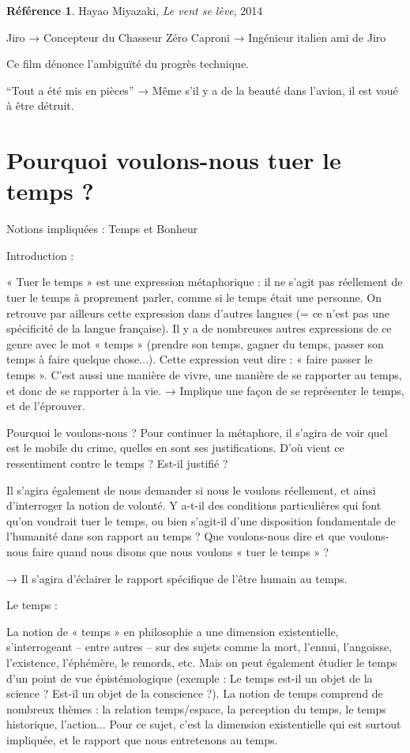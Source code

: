 \documentclass[french]{book}
\theoremstyle{definition}
\newtheorem*{refe}{Référence}
\begin{document}
\begin{refe}
	Hayao Miyazaki, \textit{Le vent se lève}, 2014
\end{refe}

Jiro → Concepteur du Chasseur Zéro
Caproni → Ingénieur italien ami de Jiro

Ce film dénonce l’ambiguïté du progrès technique.

“Tout a été mis en pièces” → Même s’il y a de la beauté dans l’avion, il est voué à être détruit.


\chapter{Pourquoi voulons-nous tuer le temps ?}

Notions impliquées : Temps et Bonheur

Introduction :

« Tuer le temps » est une expression métaphorique : il ne s’agit pas réellement de tuer le temps à proprement parler, comme si le temps était une personne. On retrouve par ailleurs cette expression dans d’autres langues (= ce n’est pas une spécificité de la langue française). Il y a de nombreuses autres expressions de ce genre avec le mot « temps » (prendre son temps, gagner du temps, passer son temps à faire quelque chose...). Cette expression veut dire : « faire passer le temps ». C’est aussi une manière de vivre, une manière de se rapporter au temps, et donc de se rapporter à la vie. → Implique une façon de se représenter le temps, et de l’éprouver.

Pourquoi le voulons-nous ? Pour continuer la métaphore, il s’agira de voir quel est le mobile du crime, quelles en sont ses justifications. D’où vient ce ressentiment contre le temps ? Est-il justifié ?

Il s’agira également de nous demander si nous le voulons réellement, et ainsi d’interroger la notion de volonté. Y a-t-il des conditions particulières qui font qu’on voudrait tuer le temps, ou bien s’agit-il d’une disposition fondamentale de l’humanité dans son rapport au temps ? Que voulons-nous dire et que voulons-nous faire quand nous disons que nous voulons « tuer le temps » ?

→ Il s’agira d’éclairer le rapport spécifique de l’être humain au temps.

Le temps :

La notion de « temps » en philosophie a une dimension existentielle, s’interrogeant – entre autres – sur des sujets comme la mort, l’ennui, l’angoisse, l’existence, l’éphémère, le remords, etc. Mais on peut également étudier le temps d’un point de vue épistémologique (exemple : Le temps est-il un objet de la science ? Est-il un objet de la conscience ?). La notion de temps comprend de nombreux thèmes : la relation temps/espace, la perception du
temps, le temps historique, l’action... Pour ce sujet, c’est la dimension existentielle qui est surtout impliquée, et le rapport que nous entretenons au temps.
\end{document}
